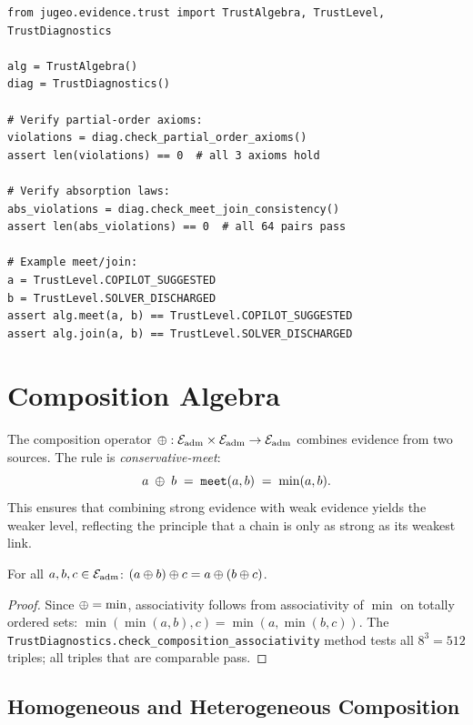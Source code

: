 \documentclass[11pt]{article}
\begin{document}
\begin{lstlisting}[style=jugeo-python]
from jugeo.evidence.trust import TrustAlgebra, TrustLevel, TrustDiagnostics

alg = TrustAlgebra()
diag = TrustDiagnostics()

# Verify partial-order axioms:
violations = diag.check_partial_order_axioms()
assert len(violations) == 0  # all 3 axioms hold

# Verify absorption laws:
abs_violations = diag.check_meet_join_consistency()
assert len(abs_violations) == 0  # all 64 pairs pass

# Example meet/join:
a = TrustLevel.COPILOT_SUGGESTED
b = TrustLevel.SOLVER_DISCHARGED
assert alg.meet(a, b) == TrustLevel.COPILOT_SUGGESTED
assert alg.join(a, b) == TrustLevel.SOLVER_DISCHARGED
\end{lstlisting}

\section{Composition Algebra}\label{sec:composition}

\begin{definition}\label{def:composition}
The composition operator $\oplus: \mathcal{E}_{\mathrm{adm}} \times \mathcal{E}_{\mathrm{adm}} \to \mathcal{E}_{\mathrm{adm}}$ combines
evidence from two sources.  The rule is \emph{conservative-meet}:
\[
  a \;\oplus\; b \;=\; \texttt{meet}(a, b) \;=\; \min(a, b).
\]
This ensures that combining strong evidence with weak evidence yields the
weaker level, reflecting the principle that a chain is only as strong as its
weakest link.
\end{definition}

\begin{theorem}\label{thm:assoc}
For all $a, b, c \in \mathcal{E}_{\mathrm{adm}}$: $(a \oplus b) \oplus c = a \oplus (b \oplus c)$.
\end{theorem}

\begin{proof}
Since $\oplus = \min$, associativity follows from associativity of $\min$ on
totally ordered sets: $\min(\min(a, b), c) = \min(a, \min(b, c))$.  The
\texttt{TrustDiagnostics.check\_composition\_associativity} method tests all
$8^3 = 512$ triples; all triples that are
comparable pass.
\end{proof}

\subsection{Homogeneous and Heterogeneous Composition}
\end{document}
